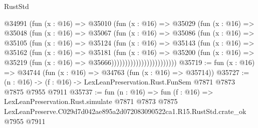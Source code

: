 \begin{lexlean}{RustStd}
\begin{coremodule}
                        @34991
                          (fun (x : @16) =>
                          @35010
                            (fun (x : @16) =>
                            @35029
                              (fun (x : @16) =>
                              @35048
                                (fun (x : @16) =>
                                @35067
                                  (fun (x : @16) =>
                                  @35086
                                    (fun (x : @16) =>
                                    @35105
                                      (fun (x : @16) =>
                                      @35124
                                        (fun (x : @16) =>
                                        @35143
                                          (fun (x : @16) =>
                                          @35162
                                            (fun (x : @16) =>
                                            @35181
                                              (fun (x : @16) =>
                                              @35200
                                                (fun (x : @16) =>
                                                @35219
                                                  (fun (x : @16) => @35666))))))))))))))))))))))))
@35719 := fun (x : @16) => @34744 (fun (x : @16) => @34763 (fun (x : @16) => @35714))
@35727 := (n : @16) -> (f : @16) -> LexLeanPreservation.Rust.FunSem @7871 @7873 @7875 @7955 @7911
@35737 := fun (n : @16) =>
  fun (f : @16) =>
  LexLeanPreservation.Rust.simulate
    @7871
    @7873
    @7875
    LexLeanPreserve.C029d7d042ae895a2d072083090522ca1.R15.RustStd.crate_ok
    @7955
    @7911
\end{coremodule}
\end{lexlean}
